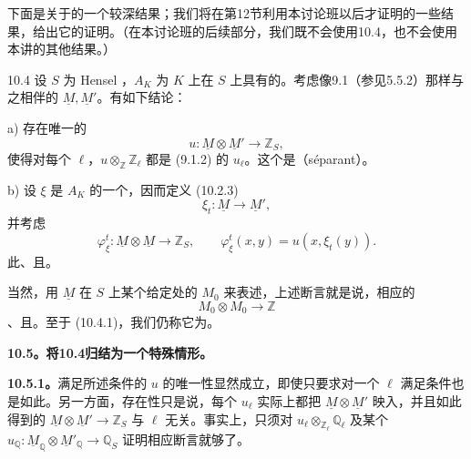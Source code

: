 下面是关于的一个较深结果；我们将在第12节利用本讨论班以后才证明的一些结果，给出它的证明。（在本讨论班的后续部分，我们既不会使用10.4，也不会使用本讲的其他结果。）

\begin{SGAresult}{}{10.4}
设 $S$ 为 Hensel ，$A_K$ 为 $K$ 上在 $S$ 上具有的。考虑像9.1（参见5.5.2）那样与之相伴的 $\underline M,\underline M'$。有如下结论：

 a) 存在唯一的
\begin{equation}\tag{10.4.1}
 u:\underline M\otimes\underline M'\longrightarrow\mathbb Z_S,
\end{equation}
使得对每个 $\ell$，$u\otimes_{\mathbb Z}\mathbb Z_\ell$ 都是 (9.1.2) 的 $u_\ell$。这个是（séparant）。

 b) 设 $\xi$ 是 $A_K$ 的一个，因而定义 (10.2.3)
\[
 \xi_t:\underline M\longrightarrow\underline M',
\]
并考虑
\begin{equation}\tag{10.4.2}
 \varphi^t_\xi:\underline M\otimes\underline M\longrightarrow\mathbb Z_S,
 \qquad \varphi^t_\xi(x,y)=u(x,\xi_t(y)).
\end{equation}
此、且。
\end{SGAresult}
当然，用 $\underline M$ 在 $S$ 上某个给定处的 $M_0$ 来表述，上述断言就是说，相应的
\[
 M_0\otimes M_0\longrightarrow\mathbb Z
\]
、且。至于 (10.4.1)，我们仍称它为。

\textbf{10.5。将10.4归结为一个特殊情形。}

\textbf{10.5.1。}满足所述条件的 $u$ 的唯一性显然成立，即使只要求对一个 $\ell$ 满足条件也是如此。另一方面，存在性只是说，每个 $u_\ell$ 实际上都把 $\underline M\otimes\underline M'$ 映入，并且如此得到的 $\underline M\otimes\underline M'\longrightarrow\mathbb Z_S$ 与 $\ell$ 无关。事实上，只须对 $u_\ell\otimes_{\mathbb Z_\ell}\mathbb Q_\ell$ 及某个 $u_{\mathbb Q}:\underline M_{\mathbb Q}\otimes\underline M'_{\mathbb Q}\longrightarrow\mathbb Q_S$ 证明相应断言就够了。

